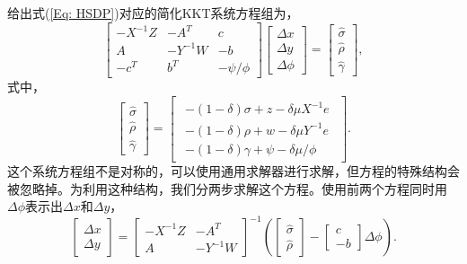 \documentclass{ctexart}
\numberwithin{equation}{section} %
\begin{document}
给出式(\ref{Eq: HSDP})对应的简化KKT系统方程组为，
\begin{equation}
	\label{Eq: reducedKKT}
	\begin{bmatrix}
		-X^{-1}Z & -A^T & c \\
		A & -Y^{-1}W & -b \\
		-c^T & b^T & -\psi/\phi
	\end{bmatrix}
	\begin{bmatrix}
		\Delta x \\ \Delta y \\ \Delta \phi
	\end{bmatrix}
	= \begin{bmatrix}
		\hat{\sigma} \\ \hat{\rho} \\ \hat{\gamma}
	\end{bmatrix},
\end{equation}
式中，
\begin{equation}
	\begin{bmatrix}
		\hat{\sigma} \\ \hat{\rho} \\ \hat{\gamma}
	\end{bmatrix}
	=\begin{bmatrix}
		\begin{array}{l}
			-\left(1 - \delta\right)\sigma + z - \delta\mu X^{-1}e \\
			-\left(1 - \delta\right)\rho + w - \delta\mu Y^{-1}e \\
			-\left(1 - \delta\right)\gamma + \psi - \delta\mu/\phi
		\end{array}
	\end{bmatrix}. \nonumber
\end{equation}
这个系统方程组不是对称的，可以使用通用求解器进行求解，但方程的特殊结构会被忽略掉。为利用这种结构，我们分两步求解这个方程。使用前两个方程同时用$ \Delta\phi $表示出$ \Delta x $和$ \Delta y $，
\begin{equation}
	\label{Eq: abbrEq}
	\begin{bmatrix}
		\Delta x \\ \Delta y
	\end{bmatrix}
	= \begin{bmatrix}
		-X^{-1}Z & -A^T \\
		A & -Y^{-1}W
	\end{bmatrix}^{-1}
	\left(\begin{bmatrix}
		\hat{\sigma} \\ \hat{\rho}
	\end{bmatrix}
	-\begin{bmatrix}
		c \\ -b
	\end{bmatrix}\Delta \phi 
	\right). \nonumber
\end{equation}
\end{document}
